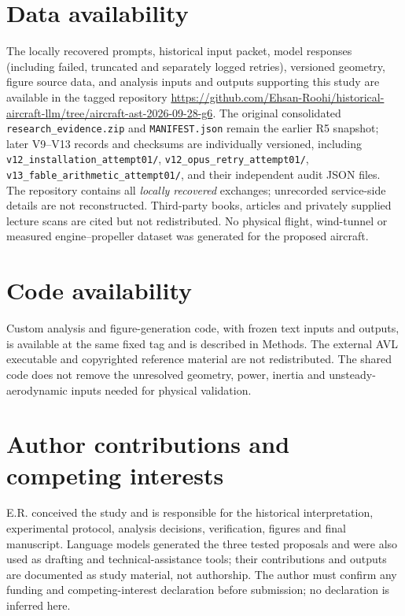 \documentclass[11pt,a4paper]{article}
\begin{document}
\section*{Data availability}
The locally recovered prompts, historical input packet, model responses (including failed, truncated and separately logged retries), versioned geometry, figure source data, and analysis inputs and outputs supporting this study are available in the tagged repository \url{https://github.com/Ehsan-Roohi/historical-aircraft-llm/tree/aircraft-ast-2026-09-28-g6}. The original consolidated \texttt{research\_evidence.zip} and \texttt{MANIFEST.json} remain the earlier R5 snapshot; later V9--V13 records and checksums are individually versioned, including \texttt{v12\_installation\_attempt01/}, \texttt{v12\_opus\_retry\_attempt01/}, \texttt{v13\_fable\_arithmetic\_attempt01/}, and their independent audit JSON files. The repository contains all \emph{locally recovered} exchanges; unrecorded service-side details are not reconstructed. Third-party books, articles and privately supplied lecture scans are cited but not redistributed. No physical flight, wind-tunnel or measured engine--propeller dataset was generated for the proposed aircraft.

\section*{Code availability}
Custom analysis and figure-generation code, with frozen text inputs and outputs, is available at the same fixed tag and is described in Methods. The external AVL executable and copyrighted reference material are not redistributed. The shared code does not remove the unresolved geometry, power, inertia and unsteady-aerodynamic inputs needed for physical validation.

\section*{Author contributions and competing interests}
E.R. conceived the study and is responsible for the historical interpretation, experimental protocol, analysis decisions, verification, figures and final manuscript. Language models generated the three tested proposals and were also used as drafting and technical-assistance tools; their contributions and outputs are documented as study material, not authorship. The author must confirm any funding and competing-interest declaration before submission; no declaration is inferred here.

\begingroup\raggedright

\endgroup
\end{document}
